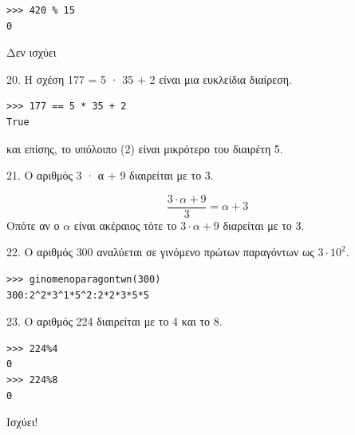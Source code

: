 \begin{lstlisting}
>>> 420 % 15
0
\end{lstlisting}
Δεν ισχύει
\begin{exercise}
 20. Η σχέση 177 = 5 · 35 + 2 είναι μια ευκλείδια διαίρεση.\end{exercise}

\begin{lstlisting}
>>> 177 == 5 * 35 + 2
True
\end{lstlisting}
και επίσης, το υπόλοιπο (2) είναι μικρότερο του διαιρέτη 5.      

\begin{exercise}
 21. Ο αριθμός 3 · α + 9 διαιρείται με το 3.\end{exercise}

$$\frac{3\cdot \alpha +9}{3} = \alpha + 3$$
Οπότε αν ο $\alpha$ είναι ακέραιος τότε το $3\cdot \alpha +9$ διαρείται με το 3.
\begin{exercise}
 22. Ο αριθμός $300$ αναλύεται σε γινόμενο πρώτων παραγόντων ως $3\cdot 10^2$.\end{exercise}

\begin{lstlisting}
>>> ginomenoparagontwn(300)
300:2^2*3^1*5^2:2*2*3*5*5
\end{lstlisting}
\begin{exercise}
 23. Ο αριθμός 224 διαιρείται με το 4 και το 8.\end{exercise}

\begin{lstlisting}
>>> 224%4
0
>>> 224%8
0
\end{lstlisting}
Ισχύει!
